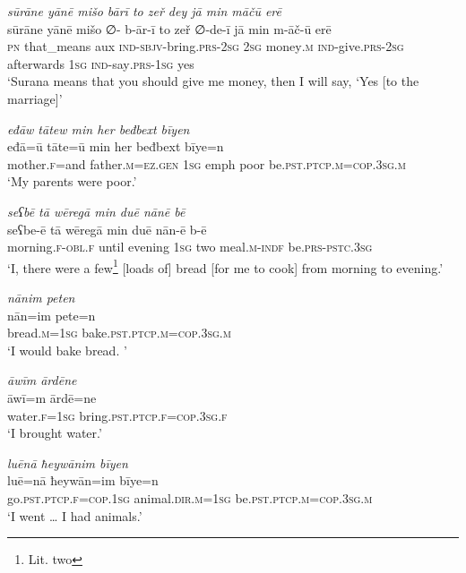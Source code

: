\ea \label{RE.60}
\textit{sūrāne yānē mišo bārī to zeř dey jā min māčū erē} \\ 
\gll sūrāne yānē mišo ∅- b-ār-ī to zeř ∅-de-ī jā min m-āč-ū erē \\ 
 \textsc{pn} that\_means aux \textsc{ind-}\textsc{sbjv-}bring\textsc{.prs}-\textsc{2sg} \textsc{2sg} money\textsc{.m} \textsc{ind-}give\textsc{.prs}-\textsc{2sg} afterwards \textsc{1sg} \textsc{ind-}say\textsc{.prs}\textsc{-\textsc{1sg}} yes \\ 
\glt `Surana means that you should give me money, then I will say, ‘Yes [to the marriage]'
\z 
 
\ea \label{ŽE.43}
\textit{eđāw tātew min her beđbext bīyen} \\ 
\gll eđā=ū tāte=ū min her beđbext bīye=n \\ 
 mother\textsc{.f}=and father\textsc{.m}\textsc{\textsc{=ez.gen}} \textsc{1sg} emph poor be\textsc{.pst}\textsc{.ptcp}\textsc{.m}\textsc{=cop}\textsc{.3sg}\textsc{.m} \\ 
\glt `My parents were poor.'
\z 
 
\ea \label{ŽE.59}
\textit{seʕbē tā wēregā min duē nānē bē} \\ 
\gll seʕbe-ē tā wēregā min duē nān-ē b-ē \\ 
 morning\textsc{.f}\textsc{-obl}\textsc{.f} until evening \textsc{1sg} two meal\textsc{.m}\textsc{-indf} be\textsc{.prs}\textsc{-pstc}\textsc{.3sg} \\ 
\glt `I, there were a few\footnote{Lit. two} [loads of] bread [for me to cook] from morning to evening.'
\z 
 
\ea \label{ŽE.60}
\textit{nānim peten} \\ 
\gll nān=im pete=n \\ 
 bread\textsc{.m}\textsc{=\textsc{1sg}} bake\textsc{.pst}\textsc{.ptcp}\textsc{.m}\textsc{=cop}\textsc{.3sg}\textsc{.m} \\ 
\glt `I would bake bread. '
\z 
 
\ea \label{ŽE.61}
\textit{āwīm ārdēne} \\ 
\gll āwī=m ārdē=ne \\ 
 water\textsc{.f}\textsc{=\textsc{1sg}} bring\textsc{.pst}\textsc{.ptcp}\textsc{.f}\textsc{=cop}\textsc{.3sg}\textsc{.f} \\ 
\glt `I brought water.'
\z 
 
\ea \label{ŽE.62}
\textit{luēnā ħeywānim bīyen} \\ 
\gll luē=nā ħeywān=im bīye=n \\ 
 go\textsc{.pst}\textsc{.ptcp}\textsc{.f}\textsc{=cop}\textsc{.\textsc{1sg}} animal\textsc{.dir}\textsc{.m}\textsc{=\textsc{1sg}} be\textsc{.pst}\textsc{.ptcp}\textsc{.m}\textsc{=cop}\textsc{.3sg}\textsc{.m} \\ 
\glt `I went … I had animals.'
\z 
 
